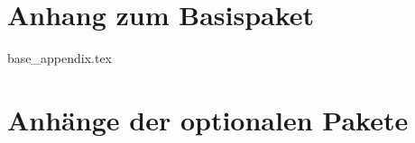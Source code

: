 \appendix

\chapter {Anhang zum Basispaket}
 {base_appendix.tex}

\chapter {Anhänge der optionalen Pakete}
